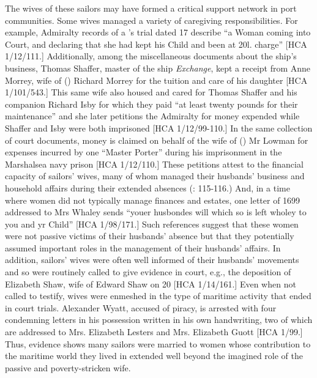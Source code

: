 The wives of these sailors may have formed a critical support network in port communities. Some wives managed a variety of caregiving responsibilities. For example, Admiralty records of a ’s trial dated 17 \citealt{December1687} describe “a Woman coming into Court, and declaring that she had kept his Child and been at 20l. charge” [HCA 1/12/111.] Additionally, among the miscellaneous documents about the ship’s business, Thomas Shaffer, master of the ship \textit{Exchange}, kept a receipt from Anne Morrey, wife of () Richard Morrey for the tuition and care of his daughter [HCA 1/101/543.] This same wife also housed and cared for Thomas Shaffer and his companion Richard Isby for which they paid “at least twenty pounds for their maintenance” and she later petitions the Admiralty for money expended while Shaffer and Isby were both imprisoned [HCA 1/12/99-110.] In the same collection of court documents, money is claimed on behalf of the wife of () Mr Lowman for expenses incurred by one “Master Porter” during his imprisonment in the Marshalsea navy prison [HCA 1/12/110.]  These petitions attest to the financial capacity of sailors’ wives, many of whom managed their husbands’ business and household affairs during their extended absences (\citealt{Jarvis2010}: 115-116.) And, in a time where women did not typically manage finances and estates, one letter of 1699 addressed to Mrs Whaley sends “youer husbondes will which so is left wholey to you and yr Child” [HCA 1/98/171.] Such references suggest that these women were not passive victims of their husbands’ absence but that they potentially assumed important roles in the management of their husbands’ affairs. In addition, sailors’ wives were often well informed of their husbands’ movements and so were routinely called to give evidence in court, e.g., the deposition of Elizabeth Shaw, wife of  Edward Shaw on 20 \citealt{July1699} [HCA 1/14/161.] Even when not called to testify, wives were enmeshed in the type of maritime activity that ended in court trials. Alexander Wyatt, accused of piracy, is arrested with four condemning letters in his possession written in his own handwriting, two of which are addressed to Mrs. Elizabeth Lesters and Mrs. Elizabeth Guott [HCA 1/99.] Thus, evidence shows many sailors were married to women whose contribution to the maritime world they lived in extended well beyond the imagined role of the passive and poverty-stricken wife. 


